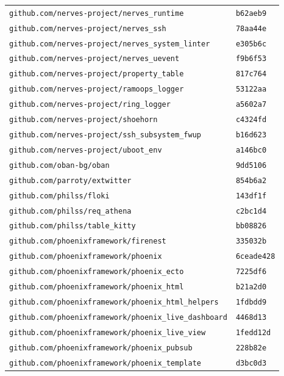\begin{longtable}{@{}p{} l@{}}
\texttt{github.com/nerves-project/nerves\_runtime} & \texttt{b62aeb9} \\
\texttt{github.com/nerves-project/nerves\_ssh} & \texttt{78aa44e} \\
\texttt{github.com/nerves-project/nerves\_system\_linter} & \texttt{e305b6c} \\
\texttt{github.com/nerves-project/nerves\_uevent} & \texttt{f9b6f53} \\
\texttt{github.com/nerves-project/property\_table} & \texttt{817c764} \\
\texttt{github.com/nerves-project/ramoops\_logger} & \texttt{53122aa} \\
\texttt{github.com/nerves-project/ring\_logger} & \texttt{a5602a7} \\
\texttt{github.com/nerves-project/shoehorn} & \texttt{c4324fd} \\
\texttt{github.com/nerves-project/ssh\_subsystem\_fwup} & \texttt{b16d623} \\
\texttt{github.com/nerves-project/uboot\_env} & \texttt{a146bc0} \\
\texttt{github.com/oban-bg/oban} & \texttt{9dd5106} \\
\texttt{github.com/parroty/extwitter} & \texttt{854b6a2} \\
\texttt{github.com/philss/floki} & \texttt{143df1f} \\
\texttt{github.com/philss/req\_athena} & \texttt{c2bc1d4} \\
\texttt{github.com/philss/table\_kitty} & \texttt{bb08826} \\
\texttt{github.com/phoenixframework/firenest} & \texttt{335032b} \\
\texttt{github.com/phoenixframework/phoenix} & \texttt{6ceade428} \\
\texttt{github.com/phoenixframework/phoenix\_ecto} & \texttt{7225df6} \\
\texttt{github.com/phoenixframework/phoenix\_html} & \texttt{b21a2d0} \\
\texttt{github.com/phoenixframework/phoenix\_html\_helpers} & \texttt{1fdbdd9} \\
\texttt{github.com/phoenixframework/phoenix\_live\_dashboard} & \texttt{4468d13} \\
\texttt{github.com/phoenixframework/phoenix\_live\_view} & \texttt{1fedd12d} \\
\texttt{github.com/phoenixframework/phoenix\_pubsub} & \texttt{228b82e} \\
\texttt{github.com/phoenixframework/phoenix\_template} & \texttt{d3bc0d3} \\

\end{longtable}
